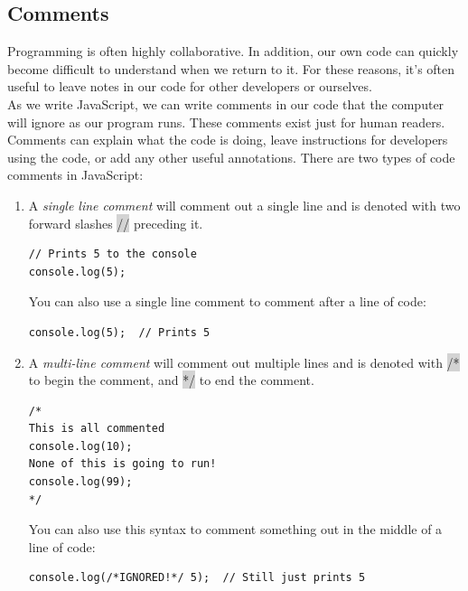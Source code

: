 \documentclass[11pt]{article}
\begin{document}
\subsection{Comments}
Programming is often highly collaborative. In addition, our own code can quickly become difficult to understand when we return to it. For these reasons, it’s often useful to leave notes in our code for other developers or ourselves.\\
\newline
As we write JavaScript, we can write comments in our code that the computer will ignore as our program runs. These comments exist just for human readers. Comments can explain what the code is doing, leave instructions for developers using the code, or add any other useful annotations. There are two types of code comments in JavaScript: 
\begin{enumerate}[leftmargin = *]
\item A \textit{single line comment} will comment out a single line and is denoted with two forward slashes \colorbox{lightgray}{//} preceding it.
\begin{lstlisting} 
// Prints 5 to the console
console.log(5);
\end{lstlisting}
You can also use a single line comment to comment after a line of code: 
\begin{lstlisting}
console.log(5);  // Prints 5 
\end{lstlisting}
\item A \textit{multi-line comment} will comment out multiple lines and is denoted with \colorbox{lightgray}{/*} to begin the comment, and \colorbox{lightgray}{*/} to end the comment.
\begin{lstlisting}
/*
This is all commented 
console.log(10);
None of this is going to run!
console.log(99);
*/
\end{lstlisting} 
You can also use this syntax to comment something out in the middle of a line of code: 
\begin{lstlisting} 
console.log(/*IGNORED!*/ 5);  // Still just prints 5 
\end{lstlisting}
\end{enumerate}
\end{document}
